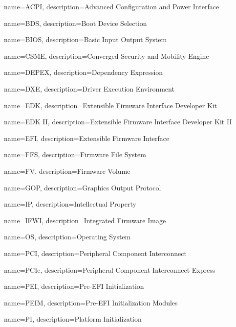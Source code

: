  {
	name=ACPI,
	description={Advanced Configuration and Power Interface
	}
}

 {
	name=BDS,
	description={Boot Device Selection
	}
}

 {
    name=BIOS,
    description={Basic Input Output System
    }
}


 {
    name=CSME,
    description={Converged Security and Mobility Engine
    }
}

 {
	name=DEPEX,
	description={Dependency Expression
	}
}


 {
	name=DXE,
	description={Driver Execution Environment
	}
}

 {
	name=EDK,
	description={Extensible Firmware Interface Developer Kit
	}
}

 {
	name={EDK II},
	description={Extensible Firmware Interface Developer Kit II
	}
}

 {
	name=EFI,
	description={Extensible Firmware Interface
	}
}

 {
    name=FFS,
    description={Firmware File System
    }
}

 {
    name=FV,
    description={Firmware Volume
    }
}

 {
    name=GOP,
    description={Graphics Output Protocol
    }
}

 {
    name=IP,
    description={Intellectual Property
    }
}

 {
    name=IFWI,
    description={Integrated Firmware Image
    }
}

 {
	name=OS,
	description={Operating System
	}
}

 {
	name=PCI,
	description={Peripheral Component Interconnect
	}
}

 {
	name=PCIe,
	description={Peripheral Component Interconnect Express
	}
}

 {
    name=PEI,
    description={Pre-EFI Initialization
    }
}

 {
    name=PEIM,
    description={Pre-EFI Initialization Modules
    }
}

 {
	name=PI,
	description={Platform Initialization
	}
}

